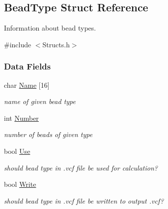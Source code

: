 \hypertarget{structBeadType}{}\subsection{Bead\+Type Struct Reference}
\label{structBeadType}


Information about bead types.  




{\ttfamily \#include $<$Structs.\+h$>$}

\subsubsection*{Data Fields}
\begin{DoxyCompactItemize}
\item 
\mbox{\label{structBeadType_a1abb836e89a090bf41cee8612da0a40b}} 
char \hyperlink{structBeadType_a1abb836e89a090bf41cee8612da0a40b}{Name} \mbox{[}16\mbox{]}
\begin{DoxyCompactList}\small\item\em name of given bead type \end{DoxyCompactList}\item 
\mbox{\label{structBeadType_a8948864f5a0b34699ab8a8ba62895aa8}} 
int \hyperlink{structBeadType_a8948864f5a0b34699ab8a8ba62895aa8}{Number}
\begin{DoxyCompactList}\small\item\em number of beads of given type \end{DoxyCompactList}\item 
\mbox{\label{structBeadType_a8178dde9f13b7be9e81dd3538a762fc6}} 
bool \hyperlink{structBeadType_a8178dde9f13b7be9e81dd3538a762fc6}{Use}
\begin{DoxyCompactList}\small\item\em should bead type in .vcf file be used for calculation? \end{DoxyCompactList}\item 
\mbox{\label{structBeadType_ab66671ca9ccd788af01da58408546637}} 
bool \hyperlink{structBeadType_ab66671ca9ccd788af01da58408546637}{Write}
\begin{DoxyCompactList}\small\item\em should bead type in .vcf file be written to output .vcf? \end{DoxyCompactList}\item 

\end{DoxyCompactItemize}
